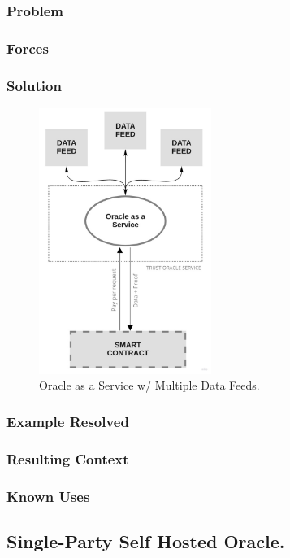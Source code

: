 \subsubsection{Problem}
\subsubsection{Forces}
\subsubsection{Solution}
\begin{figure}[t]
  \begin{center}
    \leavevmode
    \includegraphics[width=0.5\textwidth]{figures/oraclearch2.jpg}
    \caption{Oracle as a Service w/ Multiple Data Feeds.}
    \label{fig:/figures/paper-screening}
  \end{center}
\end{figure}

\subsubsection{Example Resolved}
\subsubsection{Resulting Context}
\subsubsection{Known Uses}

\subsection{Single-Party Self Hosted Oracle.}


